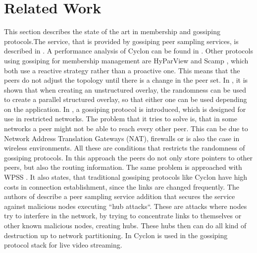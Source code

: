 \section{Related Work}
This section describes the state of the art in membership and gossiping
protocols.The service, that is provided by gossiping peer sampling services, is
described in \cite{jelasity2004peer}. A performance analysis of Cyclon can be
found in \cite{Bonnet2006}. Other protocols using gossiping for membership
management are HyParView \cite{leitao2007hyparview} and Scamp
\cite{ganesh2001scamp}, which both use a reactive strategy rather than a
proactive one. This means that the peers do not adjust the topology until there is a
change in the peer set. In \cite{maniymaran2007build}, it is shown that when
creating an unstructured overlay, the randomness can be used to create a
parallel structured overlay, so that either one can be used depending on the
application. In \cite{khelghatdoust2014gossip}, a gossiping protocol is
introduced, which is designed for use in restricted networks. The problem that
it tries to solve is, that in some networks a peer might not be able to reach
every other peer. This can be due to Network Address Translation Gateways (NAT),
firewalls or is also the case in wireless environments. All these are
conditions that restricts the randomness of gossiping protocols. In this
approach the peers do not only store pointers to other peers, but also the
routing information. The same problem is approached with WPSS
\cite{roverso2013through}. It also states, that traditional gossiping protocols
like Cyclon have high costs in connection establishment, since the links are
changed frequently. The authors of \cite{jesi2007identifying} describe a peer
sampling service addition that secures the service against malicious nodes
executing ``hub attacks``. These are attacks where nodes try to interfere in
the network, by trying to concentrate links to themselves or other known
malicious nodes, creating hubs. These hubs then can do all kind of destruction
up to network partitioning. In \cite{matoslaystream} Cyclon is used in the
gossiping protocol stack for live video streaming.

